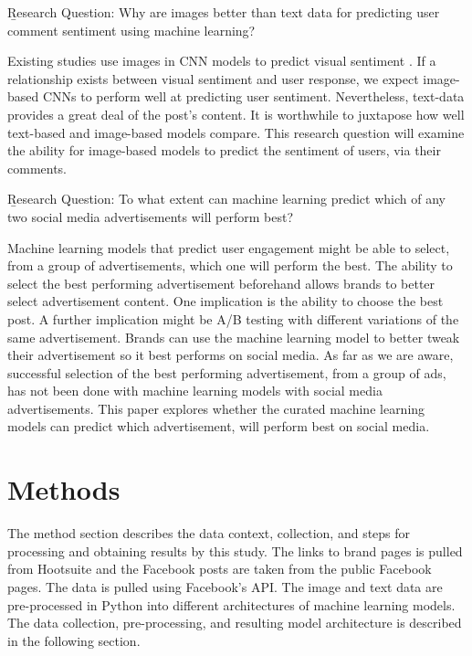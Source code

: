 \documentclass{article}
\begin{document}
\b{Research Question:} Why are images better than text data for predicting user comment sentiment using machine learning?


Existing studies use images in CNN models to predict visual sentiment \cite{Sengalin2017, Xu2014}. If a relationship exists between visual sentiment and user response, we expect image-based CNNs to perform well at predicting user sentiment. Nevertheless, text-data provides a great deal of the post's content. It is worthwhile to juxtapose how well text-based and image-based models compare. This research question will examine the ability for image-based models to predict the sentiment of users, via their comments.

\b{Research Question:} To what extent can machine learning predict which of any two social media advertisements will perform best?


Machine learning models that predict user engagement might be able to select, from a group of advertisements, which one will perform the best. The ability to select the best performing advertisement beforehand allows brands to better select advertisement content. One implication is the ability to choose the best post. A further implication might be A/B testing with different variations of the same advertisement. Brands can use the machine learning model to better tweak their advertisement so it best performs on social media. As far as we are aware, successful selection of the best performing advertisement, from a group of ads, has not been done with machine learning models with social media advertisements. This paper explores whether the curated machine learning models can predict which advertisement, will perform best on social media.

\section{Methods}
The method section describes the data context, collection, and steps for processing and obtaining results by this study. The links to brand pages is pulled from Hootsuite and the Facebook posts are taken from the public Facebook pages. The data is pulled using Facebook's API. The image and text data are pre-processed in Python into different architectures of machine learning models. The data collection, pre-processing, and resulting model architecture is described in the following section.
\end{document}
